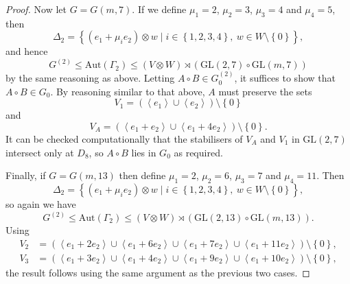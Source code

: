\documentclass[ALCO, Unicode]{cedram}
\newcommand{\Aut}{\mathrm{Aut}}
\newcommand{\GL}{\mathrm{GL}}
\begin{document}
\begin{proof}
Now let $G = G{\left(m, 7 \right)}$. If we define $\mu_1 = 2$, $\mu_2 = 3$, $\mu_3 = 4$ and $\mu_4 = 5$, then
\begin{displaymath}
    \Delta_2 = {\left\{\left(e_1 + \mu_i e_2 \right) \otimes w \mid i \in {\left\{1, 2, 3, 4 \right\}},\ w \in W \setminus \left\{0 \right\}\right\}},
\end{displaymath}
and hence
\begin{displaymath}
    G^{\left(2 \right)} \leqslant \Aut{\left(\Gamma_2 \right)} \leqslant \left(V \otimes W \right) \rtimes {\left(\GL{\left(2, 7 \right)} \circ \GL{\left(m, 7 \right)}\right)}
\end{displaymath}
by the same reasoning as above. Letting $A \circ B \in G^{\left(2 \right)}_0$, it suffices to show that $A \circ B \in G_0$. By reasoning similar to that above, $A$ must preserve the sets
\begin{displaymath}
    V_1 = \left(\left<e_1 \right> \cup \left<e_2 \right> \right) \setminus \left\{0 \right\}
\end{displaymath}
and
\begin{displaymath}
    V_A = \left(\left<e_1 + e_2 \right> \cup \left<e_1 + 4 e_2 \right> \right) \setminus {\left\{0 \right\}}.
\end{displaymath}
It can be checked computationally that the stabilisers of $V_A$ and $V_1$ in $\GL{\left(2, 7 \right)}$ intersect only at $D_8$, so $A \circ B$ lies in $G_0$ as required.

Finally, if $G = G{\left(m, 13 \right)}$ then define $\mu_1 = 2$, $\mu_2 = 6$, $\mu_3 = 7$ and $\mu_4 = 11$. Then
\begin{displaymath}
    \Delta_2 = {\left\{\left(e_1 + \mu_i e_2 \right) \otimes w \mid i \in {\left\{1, 2, 3, 4 \right\}},\ w \in W \setminus \left\{0 \right\}\right\}},
\end{displaymath}
so again we have
\begin{displaymath}
    G^{\left(2 \right)} \leqslant \Aut{\left(\Gamma_2 \right)} \leqslant \left(V \otimes W \right) \rtimes {\left(\GL{\left(2, 13 \right)} \circ \GL{\left(m, 13 \right)}\right)}.
\end{displaymath}
Using
\begin{align*}
    V_2 &= \left(\left<e_1 + 2 e_2 \right> \cup \left<e_1 + 6 e_2 \right> \cup \left<e_1 + 7 e_2 \right> \cup \left<e_1 + 11 e_2 \right> \right) \setminus {\left\{0 \right\}}, \\
    V_3 &= \left(\left<e_1 + 3 e_2 \right> \cup \left<e_1 + 4 e_2 \right> \cup \left<e_1 + 9 e_2 \right> \cup \left<e_1 + 10 e_2 \right> \right) \setminus {\left\{0 \right\}},
\end{align*}
the result follows using the same argument as the previous two cases.
\end{proof}
\end{document}
